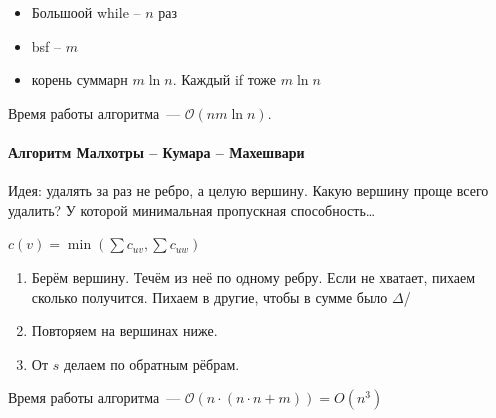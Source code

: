 \begin{itemize}
    \item Большоой while -- $n$ раз
    \item bsf -- $m$
    \item корень суммарн $m\ln n$. Каждый if тоже $m\ln n$
\end{itemize}

Время работы алгоритма~--- $\mathcal{O}\left( nm \ln n \right) $.

\paragraph*{Алгоритм Малхотры -- Кумара -- Махешвари}

Идея: удалять за раз не ребро, а целую вершину. Какую вершину проще всего удалить? У которой минимальная пропускная способность\ldots

$c(v) = \min \left( \sum c_{uv}, \sum c_{uw} \right) $

\begin{enumerate}
    \item Берём вершину. Течём из неё по одному ребру. Если не хватает, пихаем сколько получится. Пихаем в другие, чтобы в сумме было $\Delta$/
    \item Повторяем на вершинах ниже.
    \item От $s$ делаем по обратным рёбрам.
\end{enumerate}

Время работы алгоритма~--- $\mathcal O(n\cdot (n\cdot n + m)) = O(n^3)$
\endinput